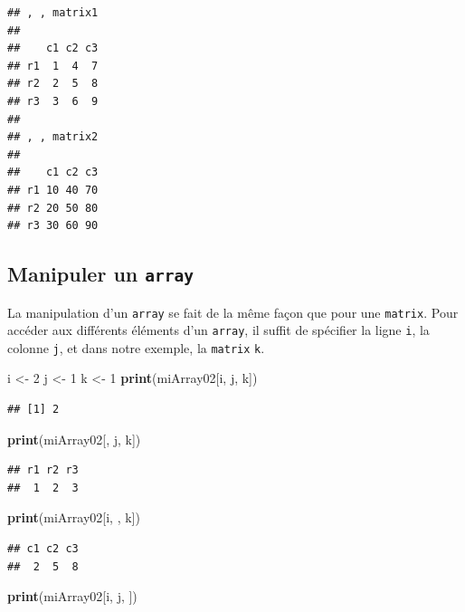 \documentclass[
]{book}
\newenvironment{Shaded}{\begin{snugshade}}{\end{snugshade}}
\newcommand{\DecValTok}[1]{\textcolor[rgb]{0.00,0.00,0.81}{#1}}
\newcommand{\KeywordTok}[1]{\textcolor[rgb]{0.13,0.29,0.53}{\textbf{#1}}}
\newcommand{\NormalTok}[1]{#1}
\newcommand{\StringTok}[1]{\textcolor[rgb]{0.31,0.60,0.02}{#1}}
\begin{document}
\begin{verbatim}
## , , matrix1
## 
##    c1 c2 c3
## r1  1  4  7
## r2  2  5  8
## r3  3  6  9
## 
## , , matrix2
## 
##    c1 c2 c3
## r1 10 40 70
## r2 20 50 80
## r3 30 60 90
\end{verbatim}

\hypertarget{manipuler-un-array}{%
\subsection{\texorpdfstring{Manipuler un \texttt{array}}{Manipuler un array}}\label{manipuler-un-array}}

La manipulation d'un \texttt{array} se fait de la même façon que pour une \texttt{matrix}. Pour accéder aux différents éléments d'un \texttt{array}, il suffit de spécifier la ligne \texttt{i}, la colonne \texttt{j}, et dans notre exemple, la \texttt{matrix} \texttt{k}.

\begin{Shaded}
\begin{Highlighting}[]
\NormalTok{i <-}\StringTok{ }\DecValTok{2}
\NormalTok{j <-}\StringTok{ }\DecValTok{1}
\NormalTok{k <-}\StringTok{ }\DecValTok{1}
\KeywordTok{print}\NormalTok{(miArray02[i, j, k])}
\end{Highlighting}
\end{Shaded}

\begin{verbatim}
## [1] 2
\end{verbatim}

\begin{Shaded}
\begin{Highlighting}[]
\KeywordTok{print}\NormalTok{(miArray02[, j, k])}
\end{Highlighting}
\end{Shaded}

\begin{verbatim}
## r1 r2 r3 
##  1  2  3
\end{verbatim}

\begin{Shaded}
\begin{Highlighting}[]
\KeywordTok{print}\NormalTok{(miArray02[i, , k])}
\end{Highlighting}
\end{Shaded}

\begin{verbatim}
## c1 c2 c3 
##  2  5  8
\end{verbatim}

\begin{Shaded}
\begin{Highlighting}[]
\KeywordTok{print}\NormalTok{(miArray02[i, j, ])}
\end{Highlighting}
\end{Shaded}
\end{document}
